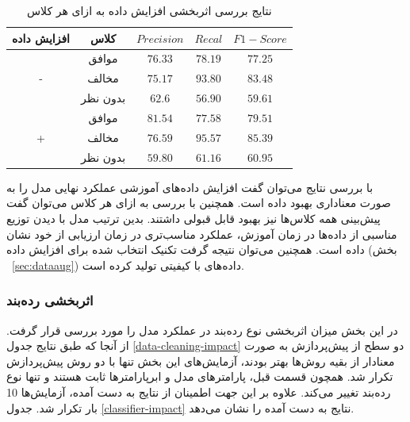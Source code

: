\begin{table}[h!]
	\centering
	\centering
	\caption
	{\label{data-aug-impact-per-class}
		نتایج بررسی اثربخشی افزایش داده به ازای هر کلاس}
	\begin{tabular}{c  c |c c c}
		\hline
		افزایش داده & کلاس & 
		$Precision$ & $Recal$ &$F1-Score$
		\\
		\hline
		
		\multirow{3}{*}{-} & موافق &
		$76.33$ & $78.19$ & $77.25$ \\ 
		& مخالف &
		$75.17$ & $93.80$ & $83.48$ \\ 
		& بدون نظر &
		$62.6$ & $56.90$ & $59.61$ \\ 
		\hline
		\multirow{3}{*}{+} & موافق &
		$81.54$ & $77.58$ & \underline{$79.51$} \\ 
		& مخالف &
		$76.59$ & $95.57$ & \underline{$85.39$} \\ 
		& بدون نظر &
		$59.80$ & $61.16$ & \underline{$60.95$} \\ 
		
		\hline
		\hline
	\end{tabular}
	
	
\end{table}

با بررسی نتایج می‌توان گفت افزایش داده‌های آموزشی عملکرد نهایی مدل را به صورت معناداری بهبود داده است. همچنین با بررسی 
به ازای هر کلاس می‌توان گفت پیش‌بینی همه کلاس‌ها نیز بهبود قابل قبولی داشتند. بدین ترتیب مدل با دیدن توزیع مناسبی از داده‌ها در زمان آموزش، عملکرد مناسب‌تری در زمان ارزیابی از خود نشان داده است. همچنین می‌توان نتیجه گرفت تکنیک انتخاب شده برای افزایش داده (بخش
~\ref{sec:dataaug})
داده‌های با کیفیتی تولید کرده است.

\subsubsection{اثربخشی رده‌بند}

در این بخش میزان اثربخشی نوع رده‌بند در عملکرد مدل را مورد بررسی قرار گرفت. از آنجا که طبق نتایج جدول
\ref{data-cleaning-impact}
دو سطح از پیش‌پردازش به صورت معنادار از بقیه روش‌ها بهتر بودند، آزمایش‌های این بخش تنها با دو روش پیش‌پردازش تکرار شد. همچون قسمت قبل، پارامترهای مدل و ابرپارامترها ثابت هستند و تنها نوع رده‌بند تغییر می‌کند. علاوه بر این جهت اطمینان از نتایج به دست آمده، آزمایش‌ها  10 بار تکرار شد. جدول
\ref{classifier-impact}
نتایج به دست آمده را نشان می‌دهد.

